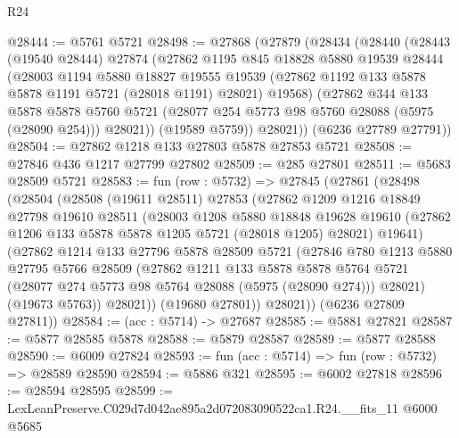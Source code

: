 \begin{lexlean}{R24}
\begin{coremodule}
@28444 := @5761 @5721
@28498 := @27868
    (@27879
      (@28434
        (@28440
          (@28443
            (@19540 @28444)
            @27874
            (@27862
              @1195
              @845
              @18828
              @5880
              @19539
              @28444
              (@28003
                @1194
                @5880
                @18827
                @19555
                @19539
                (@27862 @1192 @133 @5878 @5878 @1191 @5721 (@28018 @1191) @28021)
                @19568)
              (@27862
                @344
                @133
                @5878
                @5878
                @5760
                @5721
                (@28077 @254 @5773 @98 @5760 @28088 (@5975 (@28090 @254)))
                @28021))
            (@19589 @5759))
          @28021))
      (@6236 @27789 @27791))
@28504 := @27862 @1218 @133 @27803 @5878 @27853 @5721
@28508 := @27846 @436 @1217 @27799 @27802
@28509 := @285 @27801
@28511 := @5683 @28509 @5721
@28583 := fun (row : @5732) =>
  @27845
    (@27861
      (@28498
        (@28504
          (@28508
            (@19611 @28511)
            @27853
            (@27862
              @1209
              @1216
              @18849
              @27798
              @19610
              @28511
              (@28003
                @1208
                @5880
                @18848
                @19628
                @19610
                (@27862 @1206 @133 @5878 @5878 @1205 @5721 (@28018 @1205) @28021)
                @19641)
              (@27862
                @1214
                @133
                @27796
                @5878
                @28509
                @5721
                (@27846
                  @780
                  @1213
                  @5880
                  @27795
                  @5766
                  @28509
                  (@27862
                    @1211
                    @133
                    @5878
                    @5878
                    @5764
                    @5721
                    (@28077 @274 @5773 @98 @5764 @28088 (@5975 (@28090 @274)))
                    @28021)
                  (@19673 @5763))
                @28021))
            (@19680 @27801))
          @28021))
      (@6236 @27809 @27811))
@28584 := (acc : @5714) -> @27687
@28585 := @5881 @27821
@28587 := @5877 @28585 @5878
@28588 := @5879 @28587
@28589 := @5877 @28588
@28590 := @6009 @27824
@28593 := fun (acc : @5714) => fun (row : @5732) => @28589 @28590
@28594 := @5886 @321
@28595 := @6002 @27818
@28596 := @28594 @28595
@28599 := LexLeanPreserve.C029d7d042ae895a2d072083090522ca1.R24.__fits_11 @6000 @5685

\end{coremodule}
\end{lexlean}
